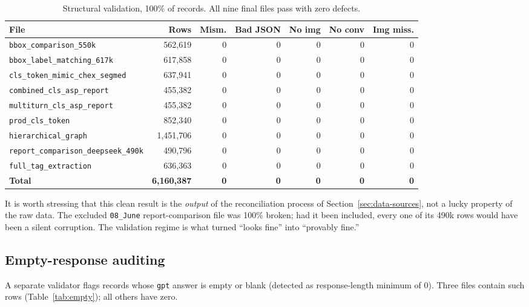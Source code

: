 \documentclass[11pt,a4paper]{article}
\begin{document}
\begin{table}[H]
\centering\footnotesize
\caption{Structural validation, 100\% of records. All nine final files pass with zero defects.}
\label{tab:validation}
\begin{tabularx}{\textwidth}{L r r r r r r}
\toprule
\textbf{File} & \textbf{Rows} & \textbf{Mism.} & \textbf{Bad JSON} & \textbf{No img} & \textbf{No conv} & \textbf{Img miss.} \\
\midrule
\texttt{bbox\_comparison\_550k} & 562{,}619 & 0 & 0 & 0 & 0 & 0 \\
\texttt{bbox\_label\_matching\_617k} & 617{,}858 & 0 & 0 & 0 & 0 & 0 \\
\texttt{cls\_token\_mimic\_chex\_segmed} & 637{,}941 & 0 & 0 & 0 & 0 & 0 \\
\texttt{combined\_cls\_asp\_report} & 455{,}382 & 0 & 0 & 0 & 0 & 0 \\
\texttt{multiturn\_cls\_asp\_report} & 455{,}382 & 0 & 0 & 0 & 0 & 0 \\
\texttt{prod\_cls\_token} & 852{,}340 & 0 & 0 & 0 & 0 & 0 \\
\texttt{hierarchical\_graph} & 1{,}451{,}706 & 0 & 0 & 0 & 0 & 0 \\
\texttt{report\_comparison\_deepseek\_490k} & 490{,}796 & 0 & 0 & 0 & 0 & 0 \\
\texttt{full\_tag\_extraction} & 636{,}363 & 0 & 0 & 0 & 0 & 0 \\
\midrule
\textbf{Total} & \textbf{6{,}160{,}387} & \textbf{0} & \textbf{0} & \textbf{0} & \textbf{0} & \textbf{0} \\
\bottomrule
\end{tabularx}
\end{table}

It is worth stressing that this clean result is the \emph{output} of the reconciliation process of Section~\ref{sec:data-sources}, not a lucky property of the raw data. The excluded \texttt{08\_June} report-comparison file was 100\% broken; had it been included, every one of its 490k rows would have been a silent corruption. The validation regime is what turned ``looks fine'' into ``provably fine.''

\subsection{Empty-response auditing}
\label{sec:empty}
A separate validator flags records whose \texttt{gpt} answer is empty or blank (detected as response-length minimum of 0). Three files contain such rows (Table~\ref{tab:empty}); all others have zero.
\end{document}
